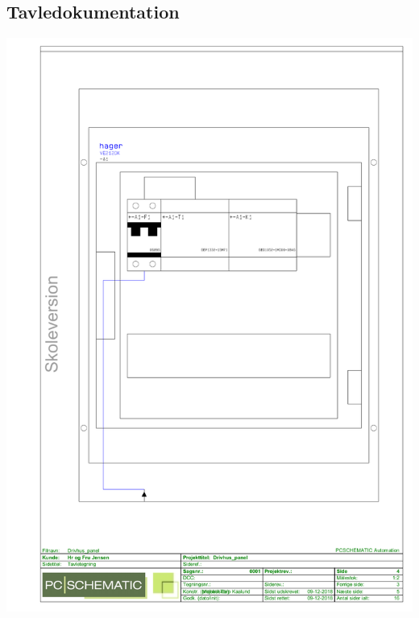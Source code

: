 \subsection{Tavledokumentation}
\includegraphics[scale=0.72]{appendix/Drivhus_panel_5.pdf}
\newpage
